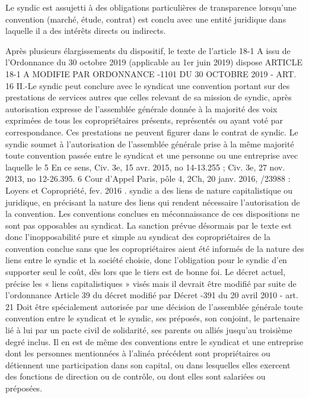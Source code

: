 			Le syndic est assujetti à des obligations particulières de transparence lorsqu’une convention (marché, étude, contrat) est conclu avec une entité juridique dans laquelle il a des intérêts directs ou indirects.
			
			Après plusieurs élargissements du dispositif, le texte de l’article 18-1 A issu de l’Ordonnance du 30 octobre 2019 (applicable au 1er juin 2019) dispose
			ARTICLE 18-1 A MODIFIE PAR ORDONNANCE -1101 DU 30 OCTOBRE 2019 - ART. 16
			II.-Le syndic peut conclure avec le syndicat une convention portant sur des prestations de services autres que celles relevant de sa mission de syndic, après autorisation expresse de l'assemblée générale donnée à la majorité des voix exprimées de tous les copropriétaires présents, représentés ou ayant voté par correspondance. Ces prestations ne peuvent figurer dans le contrat de syndic.
			Le syndic soumet à l'autorisation de l'assemblée générale prise à la même majorité toute convention passée entre le syndicat et une personne ou une entreprise avec laquelle le
			5 En ce sens, Civ. 3e, 15 avr. 2015, no 14-13.255 ; Civ. 3e, 27 nov. 2013, no 12-26.395.
			6 Cour d'Appel Paris, pôle 4, 2\degres Ch, 20 janv. 2016, /23988 : Loyers et Copropriété, fev. 2016 .
			syndic a des liens de nature capitalistique ou juridique, en précisant la nature des liens qui rendent nécessaire l'autorisation de la convention.
			Les conventions conclues en méconnaissance de ces dispositions ne sont pas opposables au syndicat.
			La sanction prévue désormais par le texte est donc l’inopposabilité pure et simple au syndicat des copropriétaires de la convention conclue sans que les copropriétaires aient été informés de la nature des liens entre le syndic et la société choisie, donc l’obligation pour le syndic d’en supporter seul le coût, dès lors que le tiers est de bonne foi.
			Le décret actuel, précise les « liens capitalistiques » visés mais il devrait être modifié par suite de l’ordonnance
			Article 39 du décret modifié par Décret -391 du 20 avril 2010 - art. 21
			Doit être spécialement autorisée par une décision de l’assemblée générale toute convention entre le syndicat et le syndic, ses préposés, son conjoint, le partenaire lié à lui par un pacte civil de solidarité, ses parents ou alliés jusqu’au troisième degré inclus.
			Il en est de même des conventions entre le syndicat et une entreprise dont les personnes mentionnées à l’alinéa précédent sont propriétaires ou détiennent une participation dans son capital, ou dans lesquelles elles exercent des fonctions de direction ou de contrôle, ou dont elles sont salariées ou préposées.
